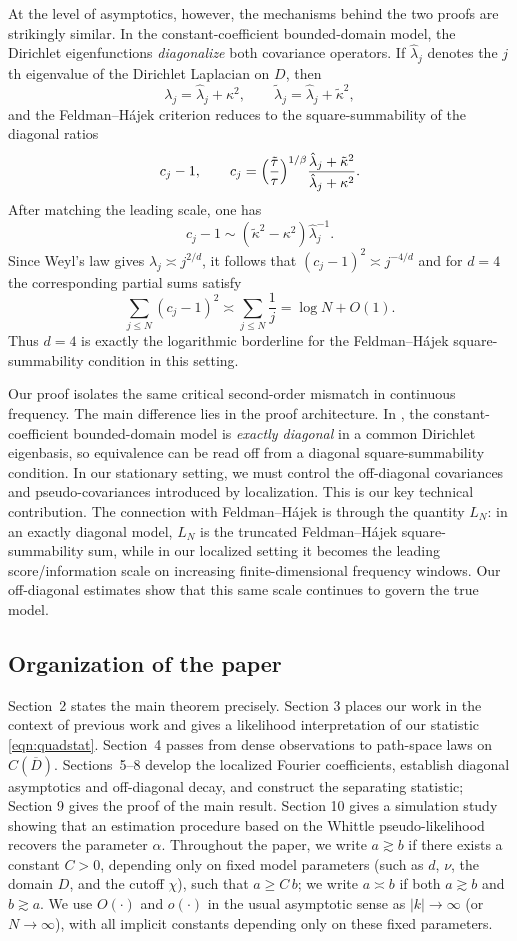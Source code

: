 \documentclass[11pt, reqno]{amsart}
\theoremstyle{remark}
\newcommand{\1}{\mathbf{1}}
\begin{document}
At the level of asymptotics, however, the mechanisms behind the two proofs are
strikingly similar. In the constant-coefficient bounded-domain model, the
Dirichlet eigenfunctions \emph{diagonalize} both covariance operators. If
$\hat\lambda_j$ denotes the $j$th eigenvalue of the Dirichlet Laplacian on $D$,
then
\[
\lambda_j=\hat\lambda_j+\kappa^2,
\qquad
\tilde\lambda_j=\hat\lambda_j+\tilde\kappa^2,
\]
and the Feldman--H\'ajek criterion \cite[Theorem 2.5]{DPZ2014} reduces to the square-summability of the
diagonal ratios
\[
c_j-1,
\qquad
c_j=
\Bigl(\frac{\tilde\tau}{\tau}\Bigr)^{1/\beta}
\frac{\hat\lambda_j+\tilde\kappa^2}{\hat\lambda_j+\kappa^2}.
\]
After matching the leading scale, one has
\[
c_j-1 \sim (\tilde\kappa^2-\kappa^2)\hat\lambda_j^{-1}.
\]
Since Weyl's law gives $\hat\lambda_j\asymp j^{2/d}$, it follows that
$
(c_j-1)^2 \asymp j^{-4/d}
$
and for $d=4$ the corresponding partial sums satisfy
\[
\sum_{j\le N}(c_j-1)^2 \asymp \sum_{j\le N}\frac1j
= \log N + O(1).
\]
Thus $d=4$ is exactly the logarithmic borderline for the
Feldman--H\'ajek square-summability condition in this setting.

Our proof isolates the same critical second-order mismatch in continuous
frequency. The main difference lies in the proof architecture. In \cite{BoliKirc2023}, the
constant-coefficient bounded-domain model is \textit{exactly diagonal} in a common
Dirichlet eigenbasis, so equivalence can be read off from a diagonal
square-summability condition. In our stationary setting, we must control the off-diagonal covariances and
pseudo-covariances introduced by localization. This is our key technical contribution. The connection with Feldman--H\'ajek is through the quantity \(L_N\): in an
exactly diagonal model, \(L_N\) is the truncated Feldman--H\'ajek
square-summability sum, while in our localized setting it becomes the leading
score/information scale on increasing finite-dimensional frequency windows.
Our off-diagonal estimates show that this same scale continues to govern the
true model.
\subsection{Organization of the paper}

Section~2 states the main theorem precisely. Section 3 places
our work in the context of previous work and gives a likelihood
interpretation of our statistic \eqref{eqn:quadstat}.
Section~4 passes from dense observations to path-space laws on
$C(\overline D)$. 
Sections~5--8 develop the localized Fourier coefficients, establish diagonal
asymptotics and off-diagonal decay, and construct the separating statistic; 
Section 9 gives the proof of the main result. Section 10 gives a simulation study showing that an estimation procedure based on the
Whittle pseudo-likelihood recovers the parameter $\alpha$.
Throughout the paper, we write \(a \gtrsim b\) if there exists a constant \(C>0\), depending only on fixed model parameters (such as \(d\), \(\nu\), the domain \(D\), and the cutoff \(\chi\)), such that \(a \ge C\, b\); we write \(a \asymp b\) if both \(a \gtrsim b\) and \(b \gtrsim a\). We use \(O(\cdot)\) and \(o(\cdot)\) in the usual asymptotic sense as \(|k|\to\infty\) (or \(N\to\infty\)), with all implicit constants depending only on these fixed parameters.
\end{document}

